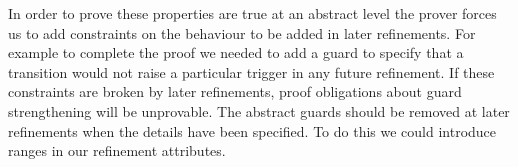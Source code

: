 In order to prove these properties are true at an abstract level the prover forces us to add constraints on the behaviour to be added in later refinements. 
For example to complete the proof we needed to add a guard to specify that a transition would not raise a particular trigger in any future refinement. 
If these constraints are broken by later refinements, proof obligations about guard strengthening will be unprovable. The abstract guards should be removed at later refinements when the details have been specified. To do this we could introduce ranges in our refinement attributes.

